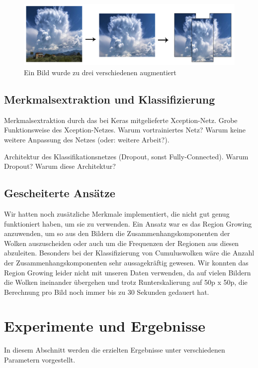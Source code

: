 \documentclass[a4,german]{article}
\begin{document}

\begin{figure}[h!]
\centering
\includegraphics[width=\textwidth]{Augmentation}
\caption{Ein Bild wurde zu drei verschiedenen augmentiert}
    \label{fig:augmentation}
\end{figure}


\subsection{Merkmalsextraktion und Klassifizierung}
\label{sec:neural}

Merkmalsextraktion durch das bei Keras mitgelieferte Xception-Netz.
Grobe Funktionsweise des Xception-Netzes.
Warum vortrainiertes Netz?
Warum keine weitere Anpassung des Netzes (oder: weitere Arbeit?).

Architektur des Klassifikationsnetzes (Dropout, sonst Fully-Connected).
Warum Dropout?
Warum diese Architektur?


\subsection{Gescheiterte Ansätze}
Wir hatten noch zusätzliche Merkmale implementiert, die nicht gut genug funktioniert haben, um sie zu verwenden.
Ein Ansatz war es das Region Growing anzuwenden, um so aus den Bildern die Zusammenhangskomponenten der Wolken auszuscheiden oder auch um die Frequenzen der Regionen aus diesen abzuleiten.
Besonders bei der Klassifizierung von Cumuluswolken %
wäre die Anzahl der Zusammenhangskomponenten sehr aussagekräftig gewesen.
Wir konnten das Region Growing leider nicht mit unseren Daten verwenden, da auf vielen Bildern die Wolken ineinander übergehen und trotz Runterskalierung auf 50p x 50p, die Berechnung pro Bild noch immer bis zu 30 Sekunden gedauert hat.


\section{Experimente und Ergebnisse}
\label{sec:experimente}
In diesem Abschnitt werden die erzielten Ergebnisse unter verschiedenen Parametern vorgestellt.
\end{document}
